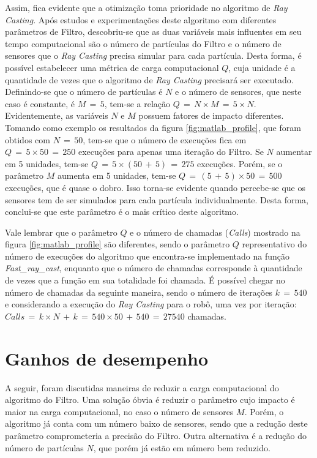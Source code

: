 \documentclass[
	12pt,				%
	openright,			%
	oneside,			%
	a4paper,			%
	english,			%
	french,				%
	spanish,			%
	brazil,				%
	]{abntex2}
\begin{document}
Assim, fica evidente que a otimização toma prioridade no algoritmo de \emph{Ray Casting}. Após estudos e experimentações deste algoritmo com diferentes parâmetros de Filtro, descobriu-se que as duas variáveis mais influentes em seu tempo computacional são o número de partículas do Filtro e o número de sensores que o \emph{Ray Casting} precisa simular para cada partícula. Desta forma, é possível estabelecer uma métrica de carga computacional $Q$, cuja unidade é a quantidade de vezes que o algoritmo de \emph{Ray Casting} precisará ser executado. 
Definindo-se que o número de partículas é $N$ e o número de sensores, que neste caso é constante, é $M\,=\,5$, tem-se a relação $Q\,=\,N\times{}M\,=\,5\times{}N$. Evidentemente, as variáveis $N$ e $M$ possuem fatores de impacto diferentes. 
Tomando como exemplo os resultados da figura \ref{fig:matlab_profile}, que foram obtidos com $N\,=\,50$, tem-se que o número de execuções fica em $Q\,=\,5\times50\,=\,250$ execuções para apenas uma iteração do Filtro. Se $N$ aumentar em 5 unidades, tem-se $Q\,=\,5\times(50\,+\,5)\,=\,275$ execuções. 
Porém, se o parâmetro $M$ aumenta em 5 unidades, tem-se $Q\,=\,(5\,+\,5)\times50\,=\,500$ execuções, que é quase o dobro. Isso torna-se evidente quando percebe-se que os sensores tem de ser simulados para cada partícula individualmente. Desta forma, conclui-se que este parâmetro é o mais crítico deste algoritmo.\par
Vale lembrar que o parâmetro $Q$ e o número de chamadas (\emph{Calls}) mostrado na figura \ref{fig:matlab_profile} são diferentes, sendo o parâmetro $Q$ representativo do número de execuções do algoritmo que encontra-se implementado na função \emph{Fast\_ray\_cast}, enquanto que o número de chamadas corresponde à quantidade de vezes que a função em sua totalidade foi chamada. É possível chegar no número de chamadas da seguinte maneira, sendo o número de iterações $k\,=\,540$ e considerando a execução do \emph{Ray Casting} para o robô, uma vez por iteração: $Calls\,=\,k\times{}N\,+\,k\,=\,540\times{}50\,+\,540\,=\,27540$ chamadas.

\section{Ganhos de desempenho}
\label{sec:ganhos_desempenho}

A seguir, foram discutidas maneiras de reduzir a carga computacional do algoritmo do Filtro. Uma solução óbvia é reduzir o parâmetro cujo impacto é maior na carga computacional, no caso o número de sensores $M$. Porém, o algoritmo já conta com um número baixo de sensores, sendo que a redução deste parâmetro comprometeria a precisão do Filtro. Outra alternativa é a redução do número de partículas $N$, que porém já estão em número bem reduzido.\par
\end{document}
